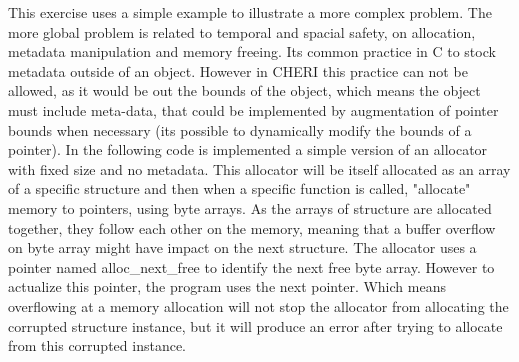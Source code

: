 \documentclass[a4paper, 11pt]{article}
\begin{document}
		This exercise uses a simple example to illustrate a more complex problem.
		The more global problem is related to temporal and spacial safety, on allocation, metadata manipulation and memory freeing. Its common practice in C to stock metadata outside of an object.
		However in CHERI this practice can not be allowed, as it would be out the bounds of the object, which means the object must include meta-data, that could be implemented by augmentation of pointer bounds when necessary (its possible to dynamically modify the bounds of a pointer).
		In the following code is implemented a simple version of an allocator with fixed size and no metadata.
		This allocator will be itself allocated as an array of a specific structure and then when a specific function is called, "allocate" memory to pointers, using byte arrays.
		As the arrays of structure are allocated together, they follow each other on the memory, meaning that a buffer overflow on byte array might have impact on the next structure.
		The allocator uses a pointer named alloc\_next\_free to identify the next free byte array. However to actualize this pointer, the program uses the next pointer. Which means overflowing at a memory allocation will not stop the allocator from allocating the corrupted structure instance, but it will produce an error after trying to allocate from this corrupted instance.
\end{document}
